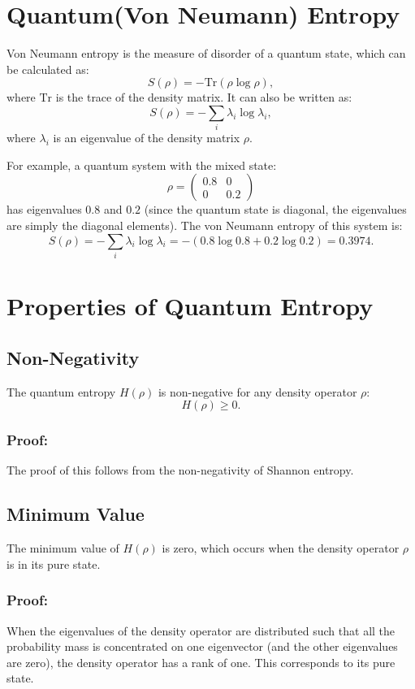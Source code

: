 \section{Quantum(Von Neumann) Entropy}
Von Neumann entropy is the measure of disorder of a quantum state, which can be calculated as:
\[
S(\rho) = -\text{Tr}(\rho \log \rho),
\]
where $\text{Tr}$ is the trace of the density matrix. It can also be written as:
\[
S(\rho) = -\sum_i \lambda_i \log \lambda_i,
\]
where $\lambda_i$ is an eigenvalue of the density matrix $\rho$.

For example, a quantum system with the mixed state:
\[
\rho = 
\begin{pmatrix}
0.8 & 0 \\
0 & 0.2
\end{pmatrix}
\]
has eigenvalues $0.8$ and $0.2$ (since the quantum state is diagonal, the eigenvalues are simply the diagonal elements). The von Neumann entropy of this system is:
\[
S(\rho) = -\sum_i \lambda_i \log \lambda_i = -(0.8 \log 0.8 + 0.2 \log 0.2) = 0.3974.
\]

\section{Properties of Quantum Entropy}

\subsection{Non-Negativity}
The quantum entropy $H(\rho)$ is non-negative for any density operator $\rho$:
\[
H(\rho) \geq 0.
\]
\subsubsection{Proof:}
The proof of this follows from the non-negativity of Shannon entropy.

\subsection{Minimum Value}
The minimum value of $H(\rho)$ is zero, which occurs when the density operator $\rho$ is in its pure state.

\subsubsection{Proof:}
When the eigenvalues of the density operator are distributed such that all the probability mass is concentrated on one eigenvector (and the other eigenvalues are zero), the density operator has a rank of one. This corresponds to its pure state.

